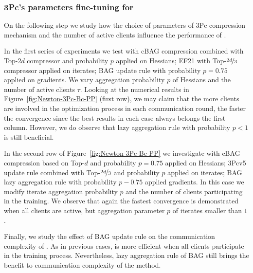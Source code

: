 \documentclass[11pt]{article}
\begin{document}
	\subsubsection{3Pc's parameters fine-tuning for }
	
	On the following step we study how the choice of parameters of 3Pc compression mechanism and the number of active clients influence the performance of . 
	
	In the first series of experiments we test  with cBAG compression combined with Top-$2d$ compressor and probability $p$ applied on Hessians; EF21 with Top-$\nicefrac{2d}{3}$ compressor applied on iterates; BAG update rule with probability $p=0.75$ applied on gradients. We vary aggregation probability $p$ of Hessians and the number of active clients $\tau$. Looking at the numerical results in Figure~\ref{fig:Newton-3Pc-Bc-PP} (first row), we may claim that the more clients are involved in the optimization process in each communication round, the faster the convergence since the best results in each case always belongs the first column. However, we do observe that lazy aggregation rule with probability $p < 1$ is still beneficial.
	
	In the second row of Figure~\ref{fig:Newton-3Pc-Bc-PP} we investigate  with cBAG compression based on Top-$d$ and probability $p=0.75$ applied on Hessians; 3Pcv5 update rule combined with Top-$\nicefrac{2d}{3}$ and probability $p$ applied on iterates; BAG lazy aggregation rule with probability $p-0.75$ applied gradients. In this case we modify iterate aggregation probability $p$ and the number of clients participating in the training. We observe that again the fastest convergence is demonstrated when all clients are active, but aggregation parameter $p$ of iterates smaller than $1$.
	
	Finally, we study the effect of BAG update rule on the communication complexity of . As in previous cases,  is more efficient when all clients participate in the training process. Nevertheless, lazy aggregation rule of BAG still brings the benefit to communication complexity of the method. 
	
\end{document}
